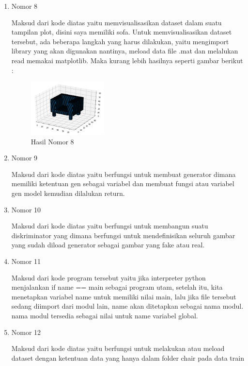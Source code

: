 \begin{enumerate}
\item Nomor 8\\
\hfill\break
	
Maksud dari kode diatas yaitu memvisualisasikan dataset dalam suatu tampilan plot, disini saya memiliki sofa. Untuk memvisualisasikan dataset tersebut, ada beberapa langkah yang harus dilakukan, yaitu mengimport library yang akan digunakan nantinya, meload data file .mat dan melalukan read memakai matplotlib. Maka kurang lebih hasilnya seperti gambar berikut :
\begin{figure}[H]
	\includegraphics[width=4cm]{figures/1174054/8/9.png}
	\centering
	\caption{Hasil Nomor 8}
\end{figure}

\item Nomor 9\\
\hfill\break
	
Maksud dari kode diatas yaitu berfungsi untuk membuat generator dimana memiliki ketentuan gen sebagai variabel dan membuat fungsi atau variabel gen model kemudian dilalukan return.

\item Nomor 10\\
\hfill\break
	
Maksud dari kode diatas yaitu berfungsi untuk membangun suatu diskriminator yang dimana berfungsi untuk mendefinisikan seluruh gambar yang sudah diload generator sebagai gambar yang fake atau real.

\item Nomor 11\\
\hfill\break
	
Maksud dari kode program tersebut yaitu jika interpreter python menjalankan if name == main sebagai program utam, setelah itu, kita menetapkan variabel name untuk memiliki nilai main, lalu jika file tersebut sedang diimport dari modul lain, name akan ditetapkan sebagai nama modul. nama modul tersedia sebagai nilai untuk name variabel global.

\item Nomor 12\\
\hfill\break
	
Maksud dari kode diatas yaitu berfungsi untuk melakukan atau meload dataset dengan ketentuan data yang hanya dalam folder chair pada data train


\end{enumerate}
